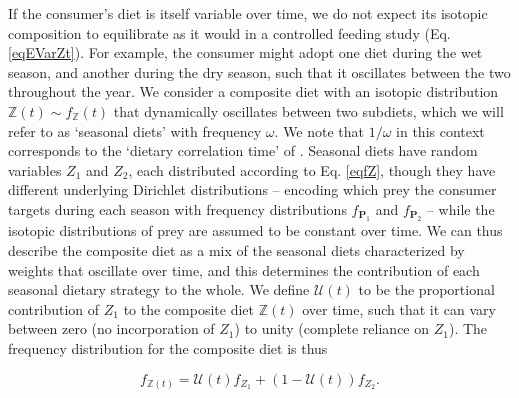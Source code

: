 \documentclass{frontiersSCNS}
\begin{document}
If the consumer's diet is itself variable over time, we do not expect its isotopic composition to equilibrate as it would in a controlled feeding study (Eq. \ref{eqEVarZt}).
For example, the consumer might adopt one diet during the wet season, and another during the dry season, such that it oscillates between the two throughout the year.
We consider a composite diet with an isotopic distribution $\mathbb{Z}(t) \sim f_{\mathbb{Z}}(t)$ that dynamically oscillates between two subdiets, which we will refer to as `seasonal diets' with frequency $\omega$.
We note that $1/\omega$ in this context corresponds to the `dietary correlation time' of \citet{Fink:2012eg}.
Seasonal diets have random variables $Z_1$ and $Z_2$, each distributed according to Eq. \ref{eqfZ}, though they have different underlying Dirichlet distributions -- encoding which prey the consumer targets during each season with frequency distributions $f_{\bm P_1}$ and $f_{\bm P_2}$ -- while the isotopic distributions of prey are assumed to be constant over time.
We can thus describe the composite diet as a mix of the seasonal diets characterized by weights that oscillate over time, and this determines the contribution of each seasonal dietary strategy to the whole.
We define $\mathcal{U}(t)$ to be the proportional contribution of $Z_1$ to the composite diet $\mathbb{Z}(t)$ over time, such that it can vary between zero (no incorporation of $Z_1$) to unity (complete reliance on $Z_1$).
The frequency distribution for the composite diet is thus


\begin{equation}
  f_{\mathbb{Z}(t)} = \mathcal{U}(t) f_{Z_1} + (1-\mathcal{U}(t)) f_{Z_2}. %
\end{equation}

\end{document}
